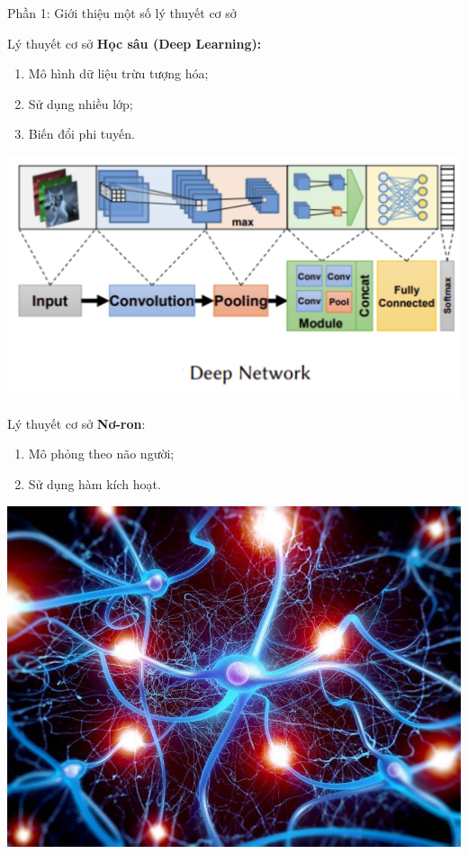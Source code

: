 \documentclass[notheorems,hyperref={bookmarks=true}]{beamer}
\theoremstyle{plain}
\numberwithin{equation}{section}
\begin{document}
\begin{footnotesize}
\begin{frame}
\begin{center}
\Large Phần 1: Giới thiệu một số lý thuyết cơ sở
\end{center}
\end{frame}


\begin{frame}{Lý thuyết cơ sở}
\textbf{Học sâu (Deep Learning): } \pause 
\begin{enumerate}[-]
	\item Mô hình dữ liệu trừu tượng hóa;
	\item Sử dụng nhiều lớp;
	\item Biến đổi phi tuyến.
\end{enumerate} 

\begin{center}
\includegraphics[scale=0.4]{Deep_1.PNG}
\end{center}
\end{frame}

\begin{frame}{Lý thuyết cơ sở}
\textbf{Nơ-ron}: \pause
\begin{enumerate}[-]
	\item Mô phỏng theo não người;
	\item Sử dụng hàm kích hoạt.
\end{enumerate}

\begin{center}
\includegraphics[scale=0.3]{neuron.jpg}
\end{center}
\end{frame}




\end{footnotesize}
\end{document}
